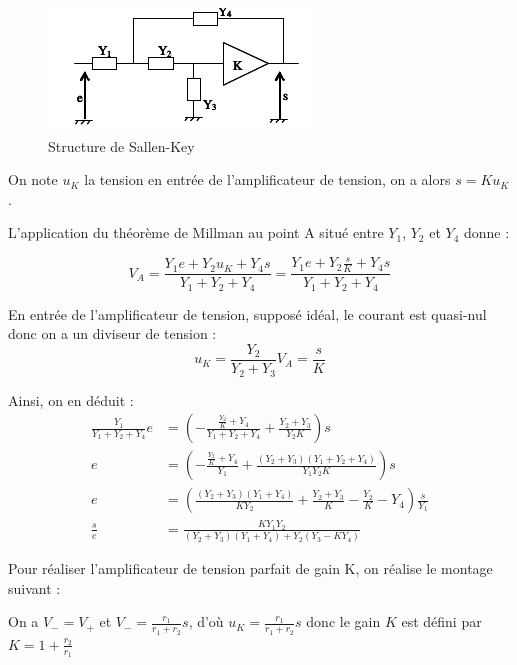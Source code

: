 \documentclass[../../Cours_M1.tex]{subfiles}
\begin{document}
\begin{figure}[h!]
\centering
\includegraphics[scale=0.6]{sk.png}
\caption{Structure de Sallen-Key}
\end{figure}

On note $u_K$ la tension en entrée de l'amplificateur de tension, on a alors $s = Ku_K$.

L'application du théorème de Millman au point A situé entre $Y_1$, $Y_2$ et $Y_4$ donne :

\[V_A = \frac{Y_1e + Y_2u_K + Y_4s}{Y_1+Y_2+Y_4} = \frac{Y_1e + Y_2\frac{s}{K} + Y_4s}{Y_1+Y_2+Y_4}\]

En entrée de l'amplificateur de tension, supposé idéal, le courant est quasi-nul donc on a un diviseur de tension :
\[u_K = \frac{Y_2}{Y_2 + Y_3} V_A =\frac{s}{K}\]

Ainsi, on en déduit :
\begin{align*}
\frac{Y_1}{Y_1+Y_2+Y_4}e & = (-\frac{\frac{Y_2}{K}+Y_4}{Y_1+Y_2+Y_4} + \frac{Y_2+Y_3}{Y_2K})s \\
e & = (-\frac{\frac{Y_2}{K}+Y_4}{Y_1} + \frac{(Y_2+Y_3)(Y_1+Y_2+Y_4)}{Y_1Y_2K})s \\
e & = (\frac{(Y_2+Y_3)(Y_1+Y_4)}{KY_2} + \frac{Y_2+Y_3}{K}-\frac{Y_2}{K}-Y_4)\frac{s}{Y_1} \\
\frac{s}{e} & = \frac{KY_1Y_2}{(Y_2+Y_3)(Y_1+Y_4)+Y_2(Y_3-KY_4)}
\end{align*}

Pour réaliser l'amplificateur de tension parfait de gain K, on réalise le montage suivant :

\begin{figure}[h!]
\centering
{}
\end{figure}

On a $V_-=V_+$ et $V_- = \frac{r_1}{r_1+r_2} s$, d'où $u_K=\frac{r_1}{r_1+r_2}s $ donc le gain $K$ est défini par $K=1+\frac{r_2}{r_1}$
\end{document}
